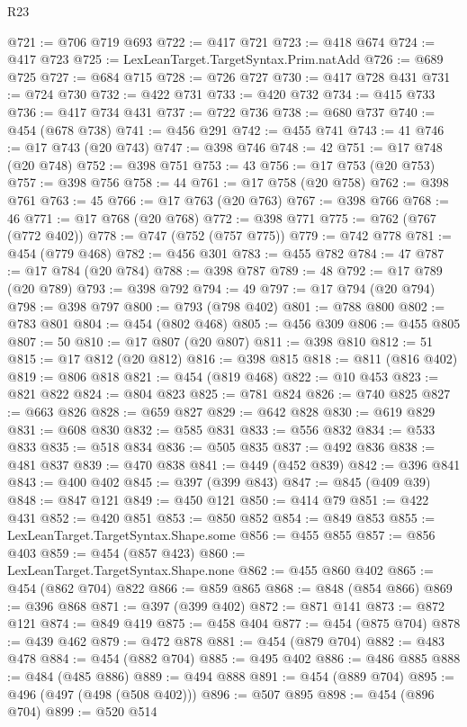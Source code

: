 \begin{lexlean}{R23}
\begin{coremodule}
{{{{{{{{{{{{{{{{{{{{{{{{{{{{{{{{{{{{{{{{{{{{{{{{{{{{{{{{{{{{{{{{{{{{{{{{{{{{{{{{{{{{{{{{{{{{{@721 := @706 @719 @693
@722 := @417 @721
@723 := @418 @674
@724 := @417 @723
@725 := LexLeanTarget.TargetSyntax.Prim.natAdd
@726 := @689 @725
@727 := @684 @715
@728 := @726 @727
@730 := @417 @728 @431
@731 := @724 @730
@732 := @422 @731
@733 := @420 @732
@734 := @415 @733
@736 := @417 @734 @431
@737 := @722 @736
@738 := @680 @737
@740 := @454 (@678 @738)
@741 := @456 @291
@742 := @455 @741
@743 := 41
@746 := @17 @743 (@20 @743)
@747 := @398 @746
@748 := 42
@751 := @17 @748 (@20 @748)
@752 := @398 @751
@753 := 43
@756 := @17 @753 (@20 @753)
@757 := @398 @756
@758 := 44
@761 := @17 @758 (@20 @758)
@762 := @398 @761
@763 := 45
@766 := @17 @763 (@20 @763)
@767 := @398 @766
@768 := 46
@771 := @17 @768 (@20 @768)
@772 := @398 @771
@775 := @762 (@767 (@772 @402))
@778 := @747 (@752 (@757 @775))
@779 := @742 @778
@781 := @454 (@779 @468)
@782 := @456 @301
@783 := @455 @782
@784 := 47
@787 := @17 @784 (@20 @784)
@788 := @398 @787
@789 := 48
@792 := @17 @789 (@20 @789)
@793 := @398 @792
@794 := 49
@797 := @17 @794 (@20 @794)
@798 := @398 @797
@800 := @793 (@798 @402)
@801 := @788 @800
@802 := @783 @801
@804 := @454 (@802 @468)
@805 := @456 @309
@806 := @455 @805
@807 := 50
@810 := @17 @807 (@20 @807)
@811 := @398 @810
@812 := 51
@815 := @17 @812 (@20 @812)
@816 := @398 @815
@818 := @811 (@816 @402)
@819 := @806 @818
@821 := @454 (@819 @468)
@822 := @10 @453
@823 := @821 @822
@824 := @804 @823
@825 := @781 @824
@826 := @740 @825
@827 := @663 @826
@828 := @659 @827
@829 := @642 @828
@830 := @619 @829
@831 := @608 @830
@832 := @585 @831
@833 := @556 @832
@834 := @533 @833
@835 := @518 @834
@836 := @505 @835
@837 := @492 @836
@838 := @481 @837
@839 := @470 @838
@841 := @449 (@452 @839)
@842 := @396 @841
@843 := @400 @402
@845 := @397 (@399 @843)
@847 := @845 (@409 @39)
@848 := @847 @121
@849 := @450 @121
@850 := @414 @79
@851 := @422 @431
@852 := @420 @851
@853 := @850 @852
@854 := @849 @853
@855 := LexLeanTarget.TargetSyntax.Shape.some
@856 := @455 @855
@857 := @856 @403
@859 := @454 (@857 @423)
@860 := LexLeanTarget.TargetSyntax.Shape.none
@862 := @455 @860 @402
@865 := @454 (@862 @704) @822
@866 := @859 @865
@868 := @848 (@854 @866)
@869 := @396 @868
@871 := @397 (@399 @402)
@872 := @871 @141
@873 := @872 @121
@874 := @849 @419
@875 := @458 @404
@877 := @454 (@875 @704)
@878 := @439 @462
@879 := @472 @878
@881 := @454 (@879 @704)
@882 := @483 @478
@884 := @454 (@882 @704)
@885 := @495 @402
@886 := @486 @885
@888 := @484 (@485 @886)
@889 := @494 @888
@891 := @454 (@889 @704)
@895 := @496 (@497 (@498 (@508 @402)))
@896 := @507 @895
@898 := @454 (@896 @704)
@899 := @520 @514
}}}}}}}}}}}}}}}}}}}}}}}}}}}}}}}}}}}}}}}}}}}}}}}}}}}}}}}}}}}}}}}}}}}}}}}}}}}}}}}}}}}}}}}}}}}}}
\end{coremodule}
\end{lexlean}
